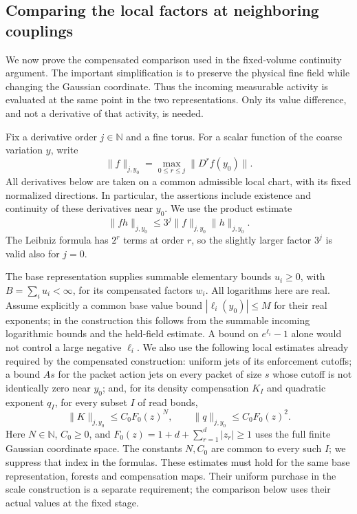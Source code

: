 \subsection{Comparing the local factors at neighboring couplings}
\label{sec:local-parameter-comparison}
We now prove the compensated comparison used in the fixed-volume
continuity argument. The important simplification is to preserve the
physical fine field while changing the Gaussian coordinate. Thus the
incoming measurable activity is evaluated at the same point in the
two representations. Only its value difference, and not a derivative
of that activity, is needed.

Fix a derivative order $j\in\mathbb N$ and a fine torus. For a scalar
function of the coarse variation $y$, write
\[
 \|f\|_{j,y_0}=\max_{0\le r\le j}\|D^rf(y_0)\|.
\]
All derivatives below are taken on a common admissible local chart,
with its fixed normalized directions. In particular, the assertions
include existence and continuity of these derivatives near $y_0$.
We use the product estimate
\begin{equation}\label{eq:local-parameter-product-jet}
       \|fh\|_{j,y_0}\le 3^j\|f\|_{j,y_0}\|h\|_{j,y_0}.
\end{equation}
The Leibniz formula has $2^r$ terms at order $r$, so the slightly
larger factor $3^j$ is valid also for $j=0$.

The base representation supplies summable elementary bounds
$u_i\ge0$, with $B=\sum_i u_i<\infty$, for its compensated factors
$w_i$. All logarithms here are real. Assume explicitly a common
base value bound $|\ell_i(y_0)|\le M$ for their real exponents;
in the construction this follows from the summable incoming logarithmic
bounds and the held-field estimate. A bound on $e^{\ell_i}-1$ alone
would not control a large negative $\ell_i$. We also use the following local estimates already required by
the compensated construction: uniform jets of its enforcement
cutoffs; a bound $A s$ for the packet action jets on every packet of
size $s$ whose cutoff is not identically zero near $y_0$; and, for
its density compensation $K_I$ and quadratic exponent $q_I$, for
every subset $I$ of read bonds,
\begin{equation}\label{eq:local-parameter-density-input}
 \|K\|_{j,y_0}\le C_0F_0(z)^N,\qquad
 \|q\|_{j,y_0}\le C_0F_0(z)^2.
\end{equation}
Here $N\in\mathbb N$, $C_0\ge0$, and
$F_0(z)=1+d+\sum_{r=1}^d|z_r|\ge1$ uses the full finite Gaussian
coordinate space. The constants $N,C_0$ are common to every such $I$; we suppress that
index in the formulas. These estimates must hold for the same base
representation, forests and compensation maps. Their uniform
purchase in the scale construction is a separate requirement; the
comparison below uses their actual values at the fixed stage.

